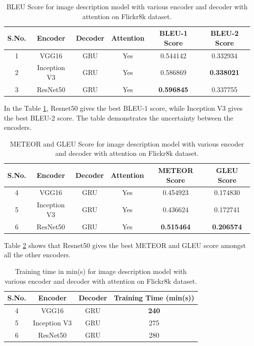 \begin{table}[h!]
    \centering
    \caption{BLEU Score for image description model with various encoder and decoder with attention on Flickr8k dataset.}
    \begin{tabular}{ |c|c|c|c|c|c| } 
     \hline
     \textbf{S.No.} & \textbf{Encoder} & \textbf{Decoder} & \textbf{Attention} & \textbf{BLEU-1 Score} & \textbf{BLEU-2 Score}\\ 
     \hline
     1 & VGG16 & GRU & Yes & 0.544142 & 0.332934 \\
     \hline
     2 & Inception V3 & GRU & Yes & 0.586869 & \textbf{0.338021} \\
     \hline
     3 & ResNet50 & GRU & Yes & \textbf{0.596845} & 0.337755 \\
     \hline
    \end{tabular}
    \label{table:5}
\end{table}
\newpage
\noindent In the Table \ref{table:5}, Resnet50 gives the best BLEU-1 score, while Inception V3 gives the best BLEU-2 score. The table demonstrates the uncertainty between the encoders.

\begin{table}[h!]
    \centering
    \caption{METEOR and GLEU Score for image description model with various encoder and decoder with attention on Flickr8k dataset.}
    \begin{tabular}{ |c|c|c|c|c|c| } 
     \hline
     \textbf{S.No.} & \textbf{Encoder} & \textbf{Decoder} & \textbf{Attention} & \textbf{METEOR Score} & \textbf{GLEU Score}\\ 
     \hline
     4 & VGG16 & GRU & Yes & 0.454923 & 0.174830	 \\
     \hline
     5 & Inception V3 & GRU & Yes & 0.436624 & 0.172741	\\
     \hline
     6 & ResNet50 & GRU & Yes & \textbf{0.515464} & \textbf{0.206574} \\
     \hline
    \end{tabular}
    
    \label{table:6}
\end{table}
\noindent Table \ref{table:6} shows that Resnet50 gives the best METEOR and GLEU score amongst all the other encoders.

\begin{table}[h!]
    \centering
    \caption{Training time in min(s) for image description model with various encoder and decoder with attention on Flickr8k dataset.}
    \begin{tabular}{ |c|c|c|c| } 
     \hline
     \textbf{S.No.} & \textbf{Encoder} & \textbf{Decoder} & \textbf{Training Time (min(s))}\\ 
     \hline
     4 & VGG16 & GRU & \textbf{240}	 \\
     \hline
     5 & Inception V3 & GRU & 275	\\
     \hline
     6 & ResNet50 & GRU & 280 \\
     \hline
    \end{tabular}
    \label{table:7}
\end{table}

